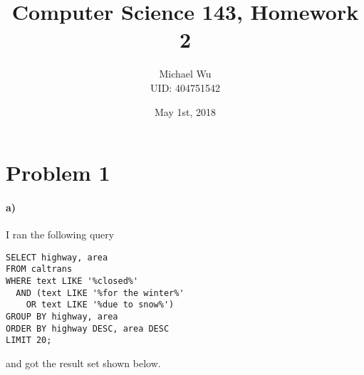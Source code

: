 \documentclass[12pt]{article}
\begin{document}
\title{Computer Science 143, Homework 2}
\date{May 1st, 2018}
\author{Michael Wu\\UID: 404751542}
\maketitle

\section*{Problem 1}

\paragraph{a)}

I ran the following query
\begin{verbatim}
SELECT highway, area
FROM caltrans
WHERE text LIKE '%closed%'
  AND (text LIKE '%for the winter%'
    OR text LIKE '%due to snow%')
GROUP BY highway, area
ORDER BY highway DESC, area DESC
LIMIT 20;
\end{verbatim}
and got the result set shown below.
\end{document}
